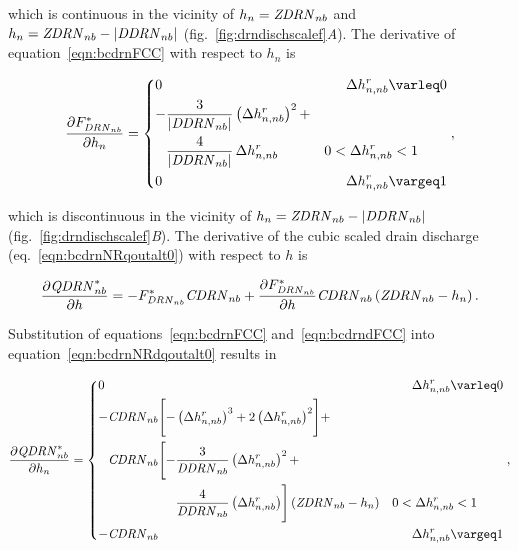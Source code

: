 \noindent which is continuous in the vicinity of $h_n = \mathit{ZDRN}_{nb}$ and $h_n = \mathit{ZDRN}_{nb} - \left| \mathit{DDRN}_{nb} \right| $ (fig.~\ref{fig:drndischscalef}\textit{A}). The derivative of equation~\ref{eqn:bcdrnFCC} with respect to $h_n$ is

\begin{equation}
	\begin{aligned}
		\label{eqn:bcdrndFCC}
		\frac{\partial F_{\mli{DRN}_{nb}}^*}{\partial h_n} = \begin{dcases} 
			0 & \phantom{0 <} \Delta h_{n,nb}^{r} \le 0 \\
			-\frac{3}{\left| \mli{DDRN}_{nb} \right|} \left( \Delta h_{n,nb}^{r} \right)^2  + \\
			\phantom{-}\frac{4}{\left| \mli{DDRN}_{nb} \right|} \, \Delta h_{n,nb}^{r} & 0 < \Delta h_{n,nb}^{r} < 1 \\
			0 & \phantom{0 <} \Delta h_{n,nb}^{r} \ge 1
		\end{dcases} ,
	\end{aligned}
\end{equation}

\noindent which is discontinuous in the vicinity of $h_n = \mathit{ZDRN}_{nb} - \left| \mathit{DDRN}_{nb} \right| $ (fig.~\ref{fig:drndischscalef}\textit{B}). The derivative of the cubic scaled drain discharge (eq.~\ref{eqn:bcdrnNRqoutalt0}) with respect to $h$ is

\begin{equation}
	\label{eqn:bcdrnNRdqoutalt0}
	\frac{\partial \mathit{QDRN}_{nb}^*}{\partial h} = -F_{\mathit{DRN}_{nb}}^* \mathit{CDRN}_{nb}  + \frac{\partial F_{\mathit{DRN}_{nb}}^*}{\partial h} \mathit{CDRN}_{nb} \left( \mathit{ZDRN}_{nb} - h_{n} \right) .
\end{equation}

\noindent Substitution of equations~\ref{eqn:bcdrnFCC} and~\ref{eqn:bcdrndFCC} into equation~\ref{eqn:bcdrnNRdqoutalt0} results in 

\begin{equation}
	\begin{aligned}
		\label{eqn:bcdrndQdh}
		\frac{\partial \mli{QDRN}_{nb}^*}{\partial h_n} = \begin{dcases} 
			0 & \phantom{0 <} \Delta h_{n,nb}^{r} \le 0 \\
			-\mli{CDRN}_{nb} \Biggl[ - \left( \Delta h_{n,nb}^{r} \right)^3  + 2 \left( \Delta h_{n,nb}^{r} \right)^2 \Biggr] + \\
			\phantom{-} \mli{CDRN}_{nb} \Biggl[- \frac{3}{\mli{DDRN}_{nb}} \left( \Delta h_{n,nb}^{r} \right)^2  + \Biggr. \\
			\Biggl. \phantom{-\mli{CDRN}_{nb} \Biggl[- } \frac{4}{\mli{DDRN}_{nb}} \left( \Delta h_{n,nb}^{r} \right) \Biggr] \left( \mli{ZDRN}_{nb} - h_{n} \right) & 0 < \Delta h_{n,nb}^{r} < 1 \\
			-\mli{CDRN}_{nb} & \phantom{0 <} \Delta h_{n,nb}^{r} \ge 1
		\end{dcases} ,
	\end{aligned}
\end{equation}

